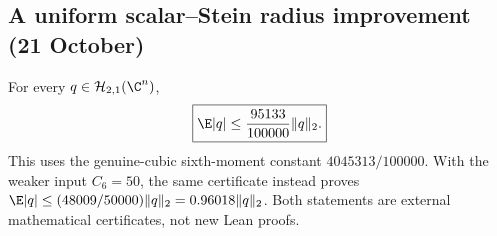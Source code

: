 \subsection{A uniform scalar--Stein radius improvement (21 October)}
\label{sec:real-stein-radius-20261021}

\begin{theorem}
\label{thm:real-stein-radius-20261021}
For every $q\in\mathcal H_{2,1}(\C^n)$,
\[
 \boxed{\E|q|\le\frac{95133}{100000}\|q\|_2.}
\]
This uses the genuine-cubic sixth-moment constant $4045313/100000$.
With the weaker input $C_6=50$, the same certificate instead proves
$\E|q|\le(48009/50000)\|q\|_2=0.96018\|q\|_2$.
Both statements are external mathematical certificates, not new Lean proofs.
\end{theorem}
